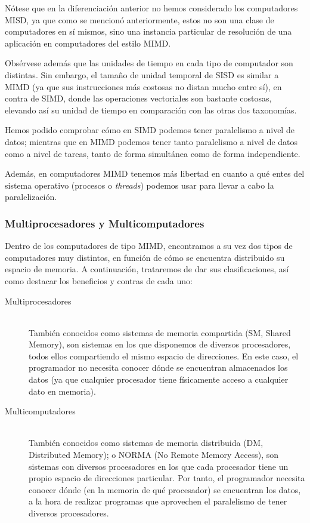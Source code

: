 \begin{observacion}
    Nótese que en la diferenciación anterior no hemos considerado los computadores MISD, ya que como se mencionó anteriormente, estos no son una clase de computadores en sí mismos, sino una instancia particular de resolución de una aplicación en computadores del estilo MIMD.

    Obsérvese además que las unidades de tiempo en cada tipo de computador son distintas. Sin embargo, el tamaño de unidad temporal de SISD es similar a MIMD (ya que sus instrucciones más costosas no distan mucho entre sí), en contra de SIMD, donde las operaciones vectoriales son bastante costosas, elevando así su unidad de tiempo en comparación con las otras dos taxonomías.

    Hemos podido comprobar cómo en SIMD podemos tener paralelismo a nivel de datos; mientras que en MIMD podemos tener tanto paralelismo a nivel de datos como a nivel de tareas, tanto de forma simultánea como de forma independiente.

    Además, en computadores MIMD tenemos más libertad en cuanto a qué entes del sistema operativo (procesos o \emph{threads}) podemos usar para llevar a cabo la paralelización.
\end{observacion}

\subsubsection{Multiprocesadores y Multicomputadores}
Dentro de los computadores de tipo MIMD, encontramos a su vez dos tipos de computadores muy distintos, en función de cómo se encuentra distribuido su espacio de memoria. A continuación, trataremos de dar sus clasificaciones, así como destacar los beneficios y contras de cada uno:
\begin{description}
    \item [Multiprocesadores]~\\
        También conocidos como sistemas de memoria compartida (SM, Shared Memory), son sistemas en los que disponemos de diversos procesadores, todos ellos compartiendo el mismo espacio de direcciones. En este caso, el programador no necesita conocer dónde se encuentran almacenados los datos (ya que cualquier procesador tiene físicamente acceso a cualquier dato en memoria).
    \item [Multicomputadores]~\\
        También conocidos como sistemas de memoria distribuida (DM, Distributed Memory); o NORMA (No Remote Memory Access), son sistemas con diversos procesadores en los que cada procesador tiene un propio espacio de direcciones particular. Por tanto, el programador necesita conocer dónde (en la memoria de qué procesador) se encuentran los datos, a la hora de realizar programas que aprovechen el paralelismo de tener diversos procesadores.
\end{description}

